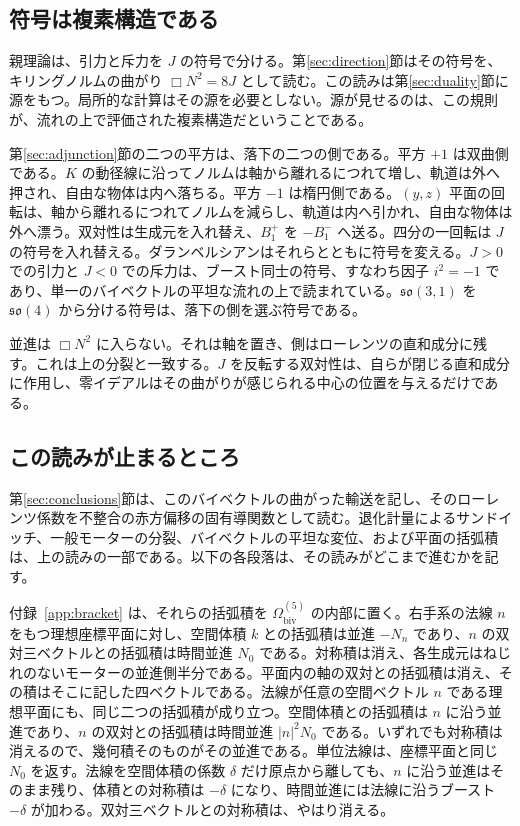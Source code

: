\documentclass[a4paper]{article}
\begin{document}
\subsection{符号は複素構造である}

親理論は、引力と斥力を \(J\) の符号で分ける。第\ref{sec:direction}節はその符号を、キリングノルムの曲がり \(\Box N^{2}=8J\) として読む。この読みは第\ref{sec:duality}節に源をもつ。局所的な計算はその源を必要としない。源が見せるのは、この規則が、流れの上で評価された複素構造だということである。

第\ref{sec:adjunction}節の二つの平方は、落下の二つの側である。平方 \(+1\) は双曲側である。\(K\) の動径線に沿ってノルムは軸から離れるにつれて増し、軌道は外へ押され、自由な物体は内へ落ちる。平方 \(-1\) は楕円側である。\((y,z)\) 平面の回転は、軸から離れるにつれてノルムを減らし、軌道は内へ引かれ、自由な物体は外へ漂う。双対性は生成元を入れ替え、\(B^{+}_{1}\) を \(-B^{-}_{1}\) へ送る。四分の一回転は \(J\) の符号を入れ替える。ダランベルシアンはそれらとともに符号を変える。\(J>0\) での引力と \(J<0\) での斥力は、ブースト同士の符号、すなわち因子 \(i^{2}=-1\) であり、単一のバイベクトルの平坦な流れの上で読まれている。\(\mathfrak{so}(3,1)\) を \(\mathfrak{so}(4)\) から分ける符号は、落下の側を選ぶ符号である。

並進は \(\Box N^{2}\) に入らない。それは軸を置き、側はローレンツの直和成分に残す。これは上の分裂と一致する。\(J\) を反転する双対性は、自らが閉じる直和成分に作用し、零イデアルはその曲がりが感じられる中心の位置を与えるだけである。

\subsection{この読みが止まるところ}

第\ref{sec:conclusions}節は、このバイベクトルの曲がった輸送を記し、そのローレンツ係数を不整合の赤方偏移の固有導関数として読む。退化計量によるサンドイッチ、一般モーターの分裂、バイベクトルの平坦な変位、および平面の括弧積は、上の読みの一部である。以下の各段落は、その読みがどこまで進むかを記す。

付録~\ref{app:bracket} は、それらの括弧積を \(\Omega_{\mathrm{biv}}^{(5)}\) の内部に置く。右手系の法線 \(n\) をもつ理想座標平面に対し、空間体積 \(k\) との括弧積は並進 \(-N_{n}\) であり、\(n\) の双対三ベクトルとの括弧積は時間並進 \(N_{0}\) である。対称積は消え、各生成元はねじれのないモーターの並進側半分である。平面内の軸の双対との括弧積は消え、その積はそこに記した四ベクトルである。法線が任意の空間ベクトル \(n\) である理想平面にも、同じ二つの括弧積が成り立つ。空間体積との括弧積は \(n\) に沿う並進であり、\(n\) の双対との括弧積は時間並進 \(|n|^{2}N_{0}\) である。いずれでも対称積は消えるので、幾何積そのものがその並進である。単位法線は、座標平面と同じ \(N_{0}\) を返す。法線を空間体積の係数 \(\delta\) だけ原点から離しても、\(n\) に沿う並進はそのまま残り、体積との対称積は \(-\delta\) になり、時間並進には法線に沿うブースト \(-\delta\) が加わる。双対三ベクトルとの対称積は、やはり消える。
\end{document}
